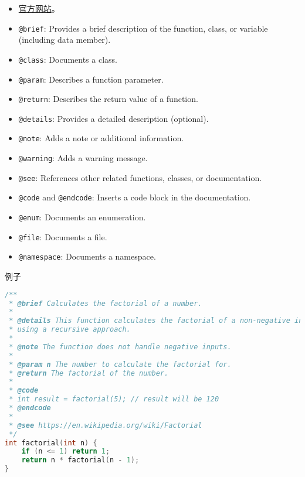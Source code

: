 
\begin{issues}
\issueDraft
\end{issues}

\begin{itemize}
\item \href{https://www.doxygen.nl/}{官方网站}。
\item \verb`@brief`: Provides a brief description of the function, class, or variable (including data member).
\item \verb`@class`: Documents a class.
\item \verb`@param`: Describes a function parameter.
\item \verb`@return`: Describes the return value of a function.
\item \verb`@details`: Provides a detailed description (optional).
\item \verb`@note`: Adds a note or additional information.
\item \verb`@warning`: Adds a warning message.
\item \verb`@see`: References other related functions, classes, or documentation.
\item \verb`@code` and \verb`@endcode`: Inserts a code block in the documentation.
\item \verb`@enum`: Documents an enumeration.
\item \verb`@file`: Documents a file.
\item \verb`@namespace`: Documents a namespace.
\end{itemize}

例子
\begin{lstlisting}[language=cpp]
/**
 * @brief Calculates the factorial of a number.
 *
 * @details This function calculates the factorial of a non-negative integer
 * using a recursive approach.
 *
 * @note The function does not handle negative inputs.
 *
 * @param n The number to calculate the factorial for.
 * @return The factorial of the number.
 *
 * @code
 * int result = factorial(5); // result will be 120
 * @endcode
 *
 * @see https://en.wikipedia.org/wiki/Factorial
 */
int factorial(int n) {
    if (n <= 1) return 1;
    return n * factorial(n - 1);
}
\end{lstlisting}


